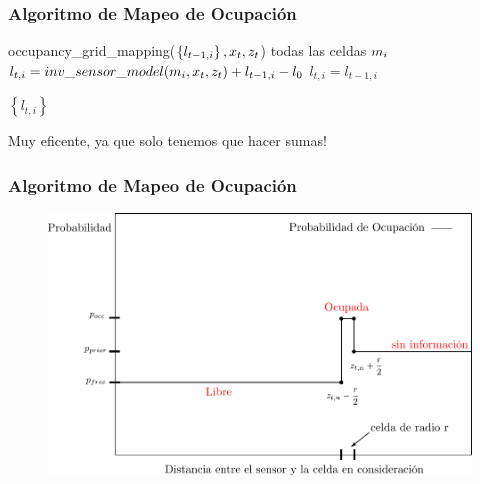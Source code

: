 \begin{frame}
    \frametitle{Algoritmo de Mapeo de Ocupación}
    
   \begin{algorithmic}[1]
       \State occupancy\_grid\_mapping($\left\lbrace l_{t-1,i} \right\rbrace, x_{t}, z_{t}$)
       \For todas las celdas $m_{i}$
            \State $l_{t,i} = inv\_sensor\_model(m_{i}, x_{t}, z_{t}) + l_{t-1,i} - l_{0}$
       \Else
       \State $l_{t,i} = l_{t-1,i}$
       \EndIf
       \EndFor
       
       \State \Return $\left\lbrace l_{t,i} \right\rbrace$
   \end{algorithmic}
    Muy eficente, ya que solo tenemos que hacer sumas!

\end{frame}

\begin{frame}
    \frametitle{Algoritmo de Mapeo de Ocupación}
    
   	\begin{figure}[!h]
        \includegraphics[width=0.5\columnwidth]{./images/inverse_senor_model_range_finder.pdf}
    \end{figure}
    
\end{frame}



